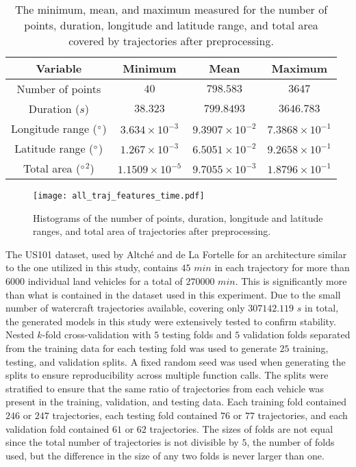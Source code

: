 \documentclass[preprint,12pt]{elsarticle}
\begin{document}
\begin{table}[!ht]
    \centering
    \begin{tabular}{|c|c|c|c|} 
        \hline
        Variable & Minimum & Mean & Maximum \\ \hline
        Number of points & $40$ & $798.583$ & $3647$ \\ \hline
        Duration ($s$) & $38.323$ & $799.8493$ & $3646.783$ \\ \hline
        Longitude range ($\degree$) & $3.634 \times 10^{-3}$ & $9.3907 \times 10^{-2}$ & $7.3868 \times 10^{-1}$ \\ \hline
        Latitude range ($\degree$) & $1.267 \times 10^{-3}$ & $6.5051 \times 10^{-2}$ & $9.2658 \times 10^{-1}$ \\ \hline
        Total area ($\degree$$^{2}$) & $1.1509 \times 10^{-5}$ & $9.7055 \times 10^{-3}$ & $1.8796 \times 10^{-1}$ \\ \hline
    \end{tabular}
    \caption{The minimum, mean, and maximum measured for the number of points, duration, longitude and latitude range, and total area covered by trajectories after preprocessing.}
    \label{tab:miniavgmaxitraj}
\end{table}

\begin{figure}[!ht]
    \centering
    \texttt{[image: all\_traj\_features\_time.pdf]}
    \caption{Histograms of the number of points, duration, longitude and latitude ranges, and total area of trajectories after preprocessing.}
    \label{fig:all_traj_features_time}
\end{figure}

The US101 dataset, used by Altché and de La Fortelle \citep{altche2017lstm} for an architecture similar to the one utilized in this study, contains $45$ $min$ in each trajectory for more than $6000$ individual land vehicles for a total of $270000$ $min$. This is significantly more than what is contained in the dataset used in this experiment. Due to the small number of watercraft trajectories available, covering only $307142.119$ $s$ in total, the generated models in this study were extensively tested to confirm stability. Nested $k$-fold cross-validation \cite{fushiki2011estimation} with $5$ testing folds and $5$ validation folds separated from the training data for each testing fold was used to generate $25$ training, testing, and validation splits. A fixed random seed was used when generating the splits to ensure reproducibility across multiple function calls. The splits were stratified to ensure that the same ratio of trajectories from each vehicle was present in the training, validation, and testing data. Each training fold contained $246$ or $247$ trajectories, each testing fold contained $76$ or $77$ trajectories, and each validation fold contained $61$ or $62$ trajectories. The sizes of folds are not equal since the total number of trajectories is not divisible by $5$, the number of folds used, but the difference in the size of any two folds is never larger than one.
\end{document}
